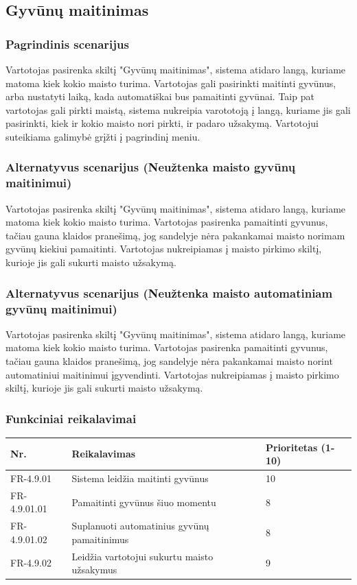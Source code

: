 \documentclass[oneside]{VUMIFPSkursinis}
\begin{document}
\subsection{Gyvūnų maitinimas}
\subsubsection{Pagrindinis scenarijus}
	Vartotojas pasirenka skiltį "Gyvūnų maitinimas", sistema atidaro langą, kuriame matoma kiek kokio maisto turima. Vartotojas gali pasirinkti maitinti gyvūnus, arba nustatyti laiką, kada automatiškai bus pamaitinti gyvūnai. Taip pat vartotojas gali pirkti maistą, sistema nukreipia varototoją į langą, kuriame jis gali pasirinkti, kiek ir kokio maisto nori pirkti, ir padaro užsakymą. Vartotojui suteikiama galimybė grįžti į pagrindinį meniu.
\subsubsection{Alternatyvus scenarijus (Neužtenka maisto gyvūnų maitinimui)}
	Vartotojas pasirenka skiltį "Gyvūnų maitinimas", sistema atidaro langą, kuriame matoma kiek kokio maisto turima. Vartotojas pasirenka pamaitinti gyvunus, tačiau gauna klaidos pranešimą, jog sandelyje nėra pakankamai maisto norimam gyvūnų kiekiui pamaitinti. Vartotojas nukreipiamas į maisto pirkimo skiltį, kurioje jis gali sukurti maisto užsakymą.
\subsubsection{Alternatyvus scenarijus (Neužtenka maisto automatiniam gyvūnų maitinimui)}
	Vartotojas pasirenka skiltį "Gyvūnų maitinimas", sistema atidaro langą, kuriame matoma kiek kokio maisto turima. Vartotojas pasirenka pamaitinti gyvunus, tačiau gauna klaidos pranešimą, jog sandelyje nėra pakankamai maisto norint automatiniui maitinimui įgyvendinti. Vartotojas nukreipiamas į maisto pirkimo skiltį, kurioje jis gali sukurti maisto užsakymą.
\subsubsection{Funkciniai reikalavimai}
\begin{table}[htbp]
	\begin{tabularx}{1\textwidth}{ |P{2.5cm}|X|P{3cm }| }  \hline
    Nr. & Reikalavimas &  Prioritetas (1-10)  \\   \hline 
    FR-4.9.01 & Sistema leidžia maitinti gyvūnus & 10  \\   \hline
		FR-4.9.01.01 & Pamaitinti gyvūnus šiuo momentu & 8  \\ \hline
		FR-4.9.01.02 & Suplanuoti automatinius gyvūnų pamaitinimus & 8 \\ \hline
		FR-4.9.02 & Leidžia vartotojui sukurtu maisto užsakymus & 9 \\  \hline
	\end{tabularx}
\end{table}
\end{document}
